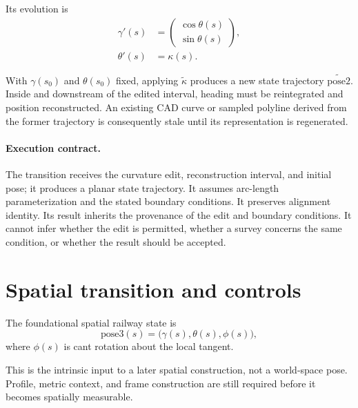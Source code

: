 Its evolution is
\begin{equation}
\begin{aligned}
\gamma'(s)&=
\begin{pmatrix}\cos\theta(s)\\\sin\theta(s)\end{pmatrix},\\
\theta'(s)&=\kappa(s).
\end{aligned}
\label{eq:pose2-evolution}
\end{equation}

With \(\gamma(s_0)\) and \(\theta(s_0)\) fixed, applying
\(\widetilde\kappa\) produces a new state trajectory
\(\widetilde{\mathrm{pose2}}\). Inside and downstream of the edited
interval, heading must be reintegrated and position reconstructed. An
existing CAD curve or sampled polyline derived from the former trajectory
is consequently stale until its representation is regenerated.

\paragraph{Execution contract.}
The transition receives the curvature edit, reconstruction interval, and
initial pose; it produces a planar state trajectory. It assumes
arc-length parameterization and the stated boundary conditions. It
preserves alignment identity. Its result inherits the provenance of the
edit and boundary conditions. It cannot infer whether the edit is
permitted, whether a survey concerns the same condition, or whether the
result should be accepted.

\section{Spatial transition and controls}

\begin{definition}
\label{def:pose3}
The foundational spatial railway state is
\begin{equation}
\mathrm{pose3}(s)=\bigl(\gamma(s),\theta(s),\phi(s)\bigr),
\label{eq:pose3-definition}
\end{equation}
where \(\phi(s)\) is cant rotation about the local tangent.
\end{definition}

This is the intrinsic input to a later spatial construction, not a
world-space pose. Profile, metric context, and frame construction are
still required before it becomes spatially measurable.

